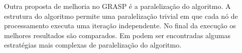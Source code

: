 \documentclass[11pt]{article}
\begin{document}
Outra proposta de melhoria no GRASP é a paralelização do algoritmo. A estrutura do algoritmo permite uma paralelização trivial em que cada nó de processamento executa uma iteração independente. No final da execução os melhores resultados são comparados. Em \cite{grasp_paralelo} podem ser encontradas algumas estratégias mais complexas de paralelização do algoritmo.





\end{document}
